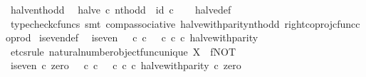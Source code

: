 \begin{isabellebody}
\endisatagproof
{\isafoldproof}%
%
\isadelimproof
\isanewline
%
\endisadelimproof
\isanewline
{}\isamarkupfalse%
\ halve{\isacharunderscore}{\kern0pt}nth{\isacharunderscore}{\kern0pt}odd{\isacharcolon}{\kern0pt}\isanewline
\ \ {\isachardoublequoteopen}halve\ {\isasymcirc}\isactrlsub c\ nth{\isacharunderscore}{\kern0pt}odd\ {\isacharequal}{\kern0pt}\ id\ {\isasymnat}\isactrlsub c{\isachardoublequoteclose}\isanewline
%
\isadelimproof
\ \ %
\endisadelimproof
%
\isatagproof
{}\isamarkupfalse%
\ halve{\isacharunderscore}{\kern0pt}def\ \isamarkupfalse%
\ {\isacharparenleft}{\kern0pt}typecheck{\isacharunderscore}{\kern0pt}cfuncs{\isacharcomma}{\kern0pt}\ smt\ comp{\isacharunderscore}{\kern0pt}associative{}\ halve{\isacharunderscore}{\kern0pt}with{\isacharunderscore}{\kern0pt}parity{\isacharunderscore}{\kern0pt}nth{\isacharunderscore}{\kern0pt}odd\ right{\isacharunderscore}{\kern0pt}coproj{\isacharunderscore}{\kern0pt}cfunc{\isacharunderscore}{\kern0pt}coprod{\isacharparenright}{\kern0pt}%
\endisatagproof
{\isafoldproof}%
%
\isadelimproof
\isanewline
%
\endisadelimproof
\isanewline
{}\isamarkupfalse%
\ is{\isacharunderscore}{\kern0pt}even{\isacharunderscore}{\kern0pt}def{}{\isacharcolon}{\kern0pt}\isanewline
\ \ {\isachardoublequoteopen}is{\isacharunderscore}{\kern0pt}even\ {\isacharequal}{\kern0pt}\ {\isacharparenleft}{\kern0pt}{\isacharparenleft}{\kern0pt}{\isasymt}\ {\isasymcirc}\isactrlsub c\ {\isasymbeta}\isactrlbsub {\isasymnat}\isactrlsub c\isactrlesub {\isacharparenright}{\kern0pt}\ {\isasymamalg}\ {\isacharparenleft}{\kern0pt}{\isasymf}\ {\isasymcirc}\isactrlsub c\ {\isasymbeta}\isactrlbsub {\isasymnat}\isactrlsub c\isactrlesub {\isacharparenright}{\kern0pt}{\isacharparenright}{\kern0pt}\ {\isasymcirc}\isactrlsub c\ halve{\isacharunderscore}{\kern0pt}with{\isacharunderscore}{\kern0pt}parity{\isachardoublequoteclose}\isanewline
%
\isadelimproof
%
\endisadelimproof
%
\isatagproof
{}\isamarkupfalse%
\ {\isacharparenleft}{\kern0pt}etcs{\isacharunderscore}{\kern0pt}rule\ natural{\isacharunderscore}{\kern0pt}number{\isacharunderscore}{\kern0pt}object{\isacharunderscore}{\kern0pt}func{\isacharunderscore}{\kern0pt}unique{\isacharbrackleft}{\kern0pt}\ X{\isacharequal}{\kern0pt}{\isasymOmega}{\isacharcomma}{\kern0pt}\ \ f{\isacharequal}{\kern0pt}NOT{\isacharbrackright}{\kern0pt}{\isacharparenright}{\kern0pt}\isanewline
\ \ \isamarkupfalse%
\ {\isachardoublequoteopen}is{\isacharunderscore}{\kern0pt}even\ {\isasymcirc}\isactrlsub c\ zero\ {\isacharequal}{\kern0pt}\ {\isacharparenleft}{\kern0pt}{\isacharparenleft}{\kern0pt}{\isasymt}\ {\isasymcirc}\isactrlsub c\ {\isasymbeta}\isactrlbsub {\isasymnat}\isactrlsub c\isactrlesub {\isacharparenright}{\kern0pt}\ {\isasymamalg}\ {\isacharparenleft}{\kern0pt}{\isasymf}\ {\isasymcirc}\isactrlsub c\ {\isasymbeta}\isactrlbsub {\isasymnat}\isactrlsub c\isactrlesub {\isacharparenright}{\kern0pt}\ {\isasymcirc}\isactrlsub c\ halve{\isacharunderscore}{\kern0pt}with{\isacharunderscore}{\kern0pt}parity{\isacharparenright}{\kern0pt}\ {\isasymcirc}\isactrlsub c\ zero{\isachardoublequoteclose}\isanewline

\end{isabellebody}
